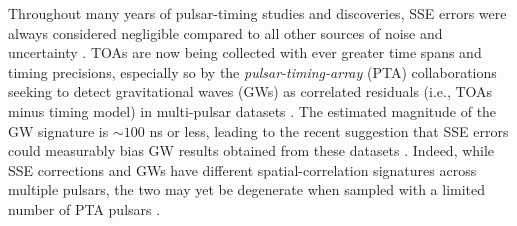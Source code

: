 \documentclass{aastex63}
\begin{document}
Throughout many years of pulsar-timing studies and discoveries, SSE errors were always considered negligible compared to all other sources of noise and uncertainty \citep{1990ApJ...361..300F,2006MNRAS.372.1549E}.
TOAs are now being collected with ever greater time spans and timing precisions, especially so by the \emph{pulsar-timing-array} (PTA) collaborations seeking to detect gravitational waves (GWs) as correlated residuals (i.e., TOAs minus timing model) in multi-pulsar datasets \citep{saz78,det79,fb90,ml13,dcl+16,h13,v+16}.
The estimated magnitude of the GW signature is $\sim 100$ ns or less, leading to the recent suggestion that SSE errors could measurably bias GW results obtained from these datasets \citep{2016MNRAS.455.4339T}. Indeed, while SSE corrections and GWs have different spatial-correlation signatures across multiple pulsars, the two may yet be degenerate when sampled with a limited number of PTA pulsars \citep{2019ApJ...876...55R}.
%
\end{document}
